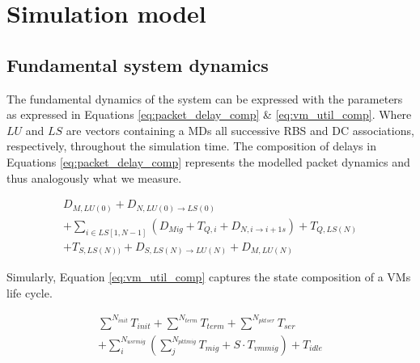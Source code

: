 \section{Simulation model} \label{sec:simulation_model}







\subsection{Fundamental system dynamics}
The fundamental dynamics of the system can be expressed with the parameters as expressed in Equations \ref{eq:packet_delay_comp} \& \ref{eq:vm_util_comp}. Where $LU$ and $LS$ are vectors containing a \ac{MD}s all successive \ac{RBS} and \ac{DC} associations, respectively, throughout the simulation time. The composition of delays in Equations \ref{eq:packet_delay_comp} represents the modelled packet dynamics and thus analogously what we measure.

\begin{multline}
D_{M,LU(0)}+D_{N,LU(0) \rightarrow LS(0)} \\ + \sum_{i \in LS[1,N-1]} \left( D_{Mig} + T_{Q,i} + D_{N,i \rightarrow i+1s} \right) + T_{Q,LS(N)} \\ + T_{S,LS(N))} + D_{S,{LS(N)} \rightarrow LU(N)} + D_{M,LU(N)}
\label{eq:packet_delay_comp}
\end{multline}

Simularly, Equation \ref{eq:vm_util_comp} captures the state composition of a \ac{VM}s life cycle. 

\begin{multline}
\sum^{N_{init}} T_{init} + \sum^{N_{term}} T_{term} + \sum^{N_{pktser}} T_{ser}  \\ + \sum_{i}^{N_{usrmig}}  \left( \sum_{j}^{N_{pktmig}}  T_{mig} +S\cdot T_{vmmig} \right ) + T_{idle}
\label{eq:vm_util_comp}
\end{multline}